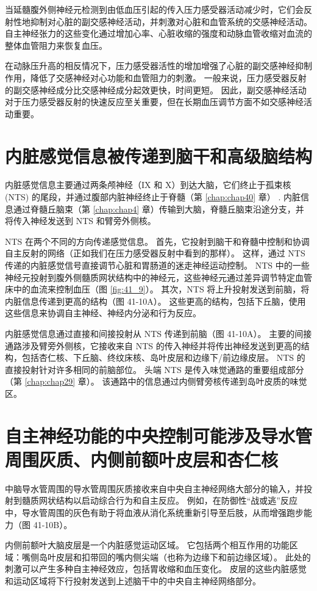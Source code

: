 当延髓腹外侧神经元检测到由低血压引起的传入压力感受器活动减少时，它们会反射性地抑制对心脏的副交感神经活动，并刺激对心脏和血管系统的交感神经活动。 自主神经张力的这些变化通过增加心率、心脏收缩的强度和动脉血管收缩对血流的整体血管阻力来恢复血压。

在动脉压升高的相反情况下，压力感受器活性的增加增强了心脏的副交感神经抑制作用，降低了交感神经对心功能和血管阻力的刺激。 一般来说，压力感受器反射的副交感神经成分比交感神经成分起效更快，时间更短。 因此，副交感神经活动对于压力感受器反射的快速反应至关重要，但在长期血压调节方面不如交感神经活动重要。

\section{内脏感觉信息被传递到脑干和高级脑结构}
内脏感觉信息主要通过两条颅神经（IX 和 X）到达大脑，它们终止于孤束核 (NTS) 的尾段，并通过腹部内脏神经终止于脊髓（第 \ref{chap:chap40} 章） . 内脏信息通过脊髓丘脑束（第 \ref{chap:chap4} 章）传输到大脑，脊髓丘脑束沿途分支，并将传入神经发送到 NTS 和臂旁外侧核。

NTS 在两个不同的方向传递感觉信息。 首先，它投射到脑干和脊髓中控制和协调自主反射的网络（正如我们在压力感受器反射中看到的那样）。 这样，通过 NTS 传递的内脏感觉信号直接调节心脏和胃肠道的迷走神经运动控制。 NTS 中的一些神经元投射到腹外侧髓质网状结构中的神经元，这些神经元通过差异调节特定血管床中的血流来控制血压（图 \ref{fig:41_9}）。 其次，NTS 将上升投射发送到前脑，将内脏信息传递到更高的结构（图 41-10A）。 这些更高的结构，包括下丘脑，使用这些信息来协调自主神经、神经内分泌和行为反应。

内脏感觉信息通过直接和间接投射从 NTS 传递到前脑（图 41-10A）。 主要的间接通路涉及臂旁外侧核，它接收来自 NTS 的传入神经并将传出神经发送到更高的结构，包括杏仁核、下丘脑、终纹床核、岛叶皮层和边缘下/前边缘皮层。 NTS 的直接投射针对许多相同的前脑部位。 头端 NTS 是传入味觉通路的重要组成部分（第 \ref{chap:chap29} 章）。 该通路中的信息通过内侧臂旁核传递到岛叶皮质的味觉区。

\section{自主神经功能的中央控制可能涉及导水管周围灰质、内侧前额叶皮层和杏仁核}
中脑导水管周围的导水管周围灰质接收来自中央自主神经网络大部分的输入，并投射到髓质网状结构以启动综合行为和自主反应。 例如，在防御性“战或逃”反应中，导水管周围的灰色有助于将血液从消化系统重新引导至后肢，从而增强跑步能力（图 41-10B）。

内侧前额叶大脑皮层是一个内脏感觉运动区域。 它包括两个相互作用的功能区域：嘴侧岛叶皮层和扣带回的嘴内侧尖端（也称为边缘下和前边缘区域）。 此处的刺激可以产生多种自主神经效应，包括胃收缩和血压变化。 皮层的这些内脏感觉和运动区域将下行投射发送到上述脑干中的中央自主神经网络部分。

